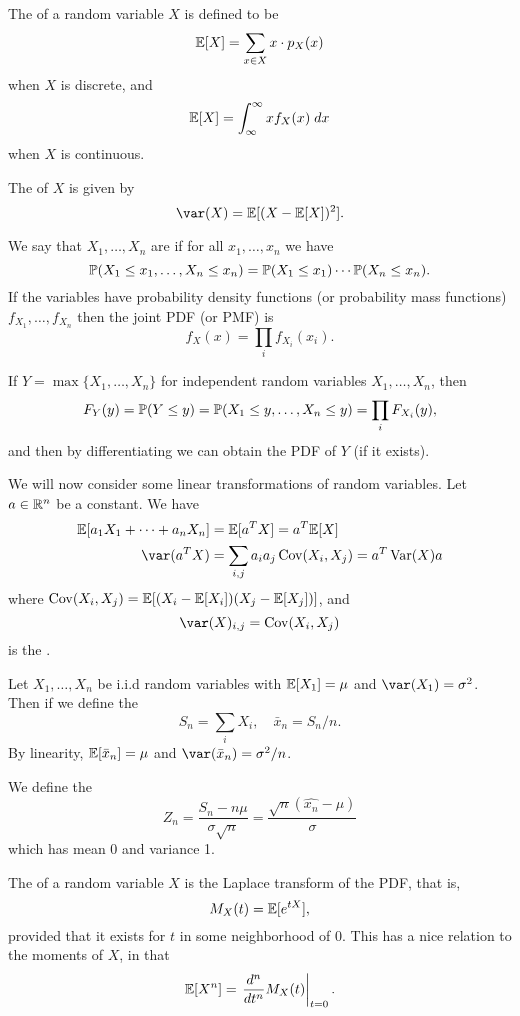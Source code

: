 \documentclass[a4paper]{scrartcl}
\begin{document}
The  of a random variable $X$ is defined to be
$$
\mathbb{E}[X] = \sum_{x \in X} x \cdot p_X(x)
$$
when $X$ is discrete, and
$$
\mathbb{E}[X] = \int_{\infty}^{\infty} x f_X(x) \; d x
$$
when $X$ is continuous. 

The  of $X$ is given by
$$
\var(X) = \EE[(X - \EE[X])^2].
$$

We say that $X_1, \dots, X_n$ are  if for all $x_1, \dots, x_n$ we have
$$
\mathbb{P}(X_1 \leq x_1, \dots, X_n \leq x_n) = \mathbb{P}(X_1 \leq x_1) \cdots \mathbb{P}(X_n \leq x_n).
$$
If the variables have probability density functions (or probability mass functions) $f_{X_1}, \dots, f_{X_n}$ then the joint PDF (or PMF) is
$$
f_X(x) = \prod_i f_{X_i}(x_i).
$$


\begin{example}
  If $Y = \max\{X_1, \dots, X_n\}$ for independent random variables $X_1, \dots, X_n$, then
$$
F_Y(y) = \mathbb{P}(Y \leq y) = \mathbb{P}(X_1 \leq y, \dots, X_n \leq y) = \prod_i F_{X_i}(y),
$$
and then by differentiating we can obtain the PDF of $Y$ (if it exists).

\end{example}

We will now consider some linear transformations of random variables.
Let $a \in \mathbb{R}^n$ be a constant.
We have
\begin{align*}
  \EE[a_1X_1 + \cdots + a_n X_n] &= \EE[a^T X] = a^T \EE[X] \\
  \var(a^T X) &= \sum_{i, j} a_i a_j \operatorname{Cov}(X_i, X_j) = a^T \operatorname{Var}(X) a
\end{align*}
where $\operatorname{Cov}(X_i, X_j) = \mathbb{E}[(X_i - \mathbb{E}[X_i])(X_j - \mathbb{E}[X_j])]$, and
$$
\var(X)_{i, j} = \operatorname{Cov}(X_i, X_j)
$$
is the .

Let $X_1, \dots, X_n$ be i.i.d random variables with $\mathbb{E}[X_1] = \mu$ and $\var(X_1) = \sigma^2$. Then if we define the  
$$
S_n = \sum_i X_i, \quad \bar{x}_n = S_n/n.
$$
By linearity, $\mathbb{E}[\bar{x}_n] = \mu$ and $\var(\bar{x}_n) = \sigma^2/n$.

We define the 
$$
Z_n = \frac{S_n- n \mu}{\sigma \sqrt{n}} = \frac{\sqrt{n}(\hat{x_n} - \mu)}{\sigma}
$$
which has mean 0 and variance 1.


The  of a random variable $X$ is the Laplace transform of the PDF, that is,
$$
M_X(t) = \mathbb{E}[e^{tX}],
$$
provided that it exists for $t$ in some neighborhood of $0$. This has a nice relation to the moments of $X$, in that
$$
\mathbb{E}[X^n] = \left.\frac{d^n}{dt^n} M_X(t) \right|_{t =0}.
$$
\end{document}

